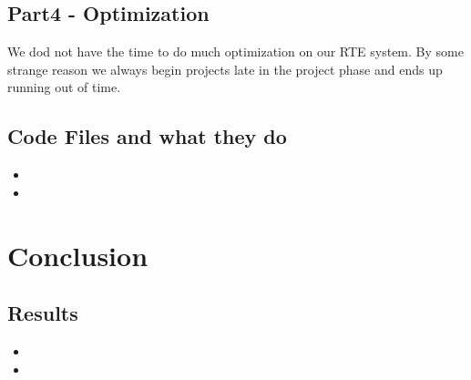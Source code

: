 \documentclass[titlepage]{article}
\begin{document}
\subsection{Part4 - Optimization}   
    We dod not have the time to do much optimization on our RTE system. By some strange reason we always begin projects late in the project phase and ends up running out of time. 


\subsection{Code Files and what they do}
\begin{itemize}
    \item
    \item
\end{itemize}

\section{Conclusion}

\subsection{Results}
\begin{itemize}
    \item
    \item
\end{itemize}
\end{document}

